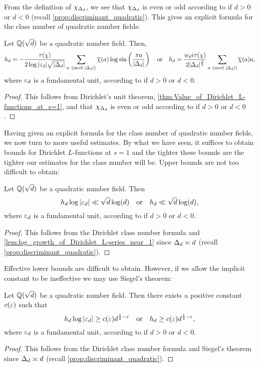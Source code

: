     From the definition of $\chi_{\Delta_{d}}$, we see that $\chi_{\Delta_{d}}$ is even or odd according to if $d > 0$ or $d < 0$ (recall \cref{prop:discriminant_quadratic}). This gives an explicit formula for the class number of quadratic number fields:

    \begin{corollary}\label{cor:formula_for_class_number_quadratic_number_field}
      Let $\mathbb{Q}(\sqrt{d})$ be a quadratic number field. Then,
      \[
        h_{d} = -\frac{\tau(\chi)}{2\log|\varepsilon_{d}|\sqrt{|\Delta_{d}|}}\sum_{a \ (\mathrm{mod}\text{ }|\Delta_{d}|)}\overline{\chi}(a)\log\sin\left(\frac{\pi a}{|\Delta_{d}|}\right) \quad \text{or} \quad h_{d} = \frac{w_{d}i\tau(\chi)}{2|\Delta_{d}|^{\frac{3}{2}}}\sum_{a \ (\mathrm{mod}\text{ }|\Delta_{d}|)}\overline{\chi}(a)a,
      \]
      where $\varepsilon_{d}$ is a fundamental unit, according to if $d > 0$ or $d < 0$.
    \end{corollary}
    \begin{proof}
      This follows from Dirichlet's unit theorem, \cref{thm:Value_of_Dirichlet_L-functions_at_s=1}, and that $\chi_{\Delta_{d}}$ is even or odd according to if $d > 0$ or $d < 0$.
    \end{proof}

    Having given an explicit formula for the class number of quadratic number fields, we now turn to more useful estimates. By what we have seen, it suffices to obtain bounds for Dirichlet $L$-functions at $s = 1$ and the tighter these bounds are the tighter our estimates for the class number will be. Upper bounds are not too difficult to obtain:

    \begin{proposition}\label{prop:class_number_upper_bound}
      Let $\mathbb{Q}(\sqrt{d})$ be a quadratic number field. Then
      \[
        h_{d}\log|\varepsilon_{d}| \ll \sqrt{d}\log(d) \quad \text{or} \quad  h_{d} \ll \sqrt{d}\log(d),
      \]
      where $\varepsilon_{d}$ is a fundamental unit, according to if $d > 0$ or $d < 0$.
    \end{proposition}
    \begin{proof}
      This follows from the Dirichlet class number formula and \cref{lem:log_growth_of_Dirichlet_L-series_near_1} since $\Delta_{d} \asymp d$ (recall \cref{prop:discriminant_quadratic}).
    \end{proof}

    Effective lower bounds are difficult to obtain. However, if we allow the implicit constant to be ineffective we may use Siegel's theorem:

    \begin{proposition}\label{prop:class_number_lower_bound}
      Let $\mathbb{Q}(\sqrt{d})$ be a quadratic number field. Then there exists a positive constant $c(\varepsilon)$ such that
      \[
        h_{d}\log|\varepsilon_{d}| \ge c(\varepsilon)d^{\frac{1}{2}-\varepsilon} \quad \text{or} \quad  h_{d} \ge c(\varepsilon)d^{\frac{1}{2}-\varepsilon},
      \]
      where $\varepsilon_{d}$ is a fundamental unit, according to if $d > 0$ or $d < 0$.
    \end{proposition}
    \begin{proof}
      This follows from the Dirichlet class number formula and Siegel's theorem since $\Delta_{d} \asymp d$ (recall \cref{prop:discriminant_quadratic}).
    \end{proof}

